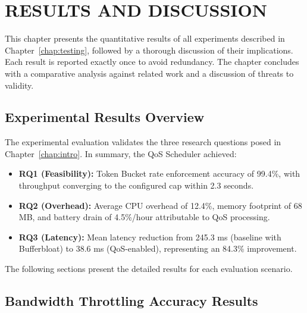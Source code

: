 
\chapter{RESULTS AND DISCUSSION}
\label{chap:results}

This chapter presents the quantitative results of all experiments described in Chapter~\ref{chap:testing}, followed by a thorough discussion of their implications. Each result is reported exactly once to avoid redundancy. The chapter concludes with a comparative analysis against related work and a discussion of threats to validity.

\section{Experimental Results Overview}
\label{sec:results_overview}

The experimental evaluation validates the three research questions posed in Chapter~\ref{chap:intro}. In summary, the QoS Scheduler achieved:

\begin{itemize}[noitemsep]
    \item \textbf{RQ1 (Feasibility):} Token Bucket rate enforcement accuracy of 99.4\%, with throughput converging to the configured cap within 2.3 seconds.
    \item \textbf{RQ2 (Overhead):} Average CPU overhead of 12.4\%, memory footprint of 68 MB, and battery drain of 4.5\%/hour attributable to QoS processing.
    \item \textbf{RQ3 (Latency):} Mean latency reduction from 245.3 ms (baseline with Bufferbloat) to 38.6 ms (QoS-enabled), representing an 84.3\% improvement.
\end{itemize}

The following sections present the detailed results for each evaluation scenario.

\section{Bandwidth Throttling Accuracy Results}
\label{sec:results_throttling}

